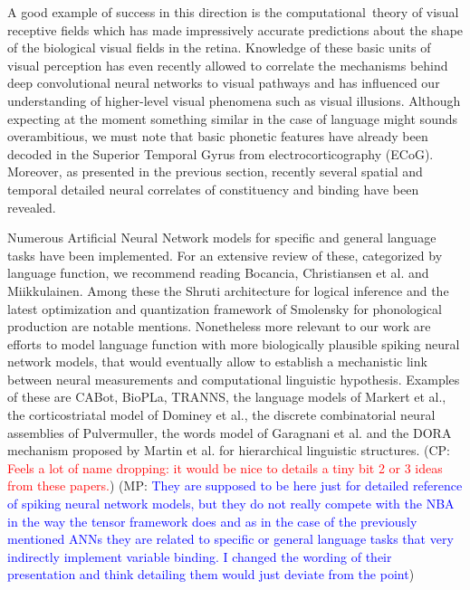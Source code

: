 \documentclass[10pt]{article}
\newcommand{\noteCP}[1]{(CP: \textcolor{red}{#1})}
\newcommand{\noteMP}[2]{(MP: \textcolor{blue}{#1})}
\begin{document}
A good example of success in this direction is the computational~theory of visual receptive fields\cite{lindeberg2017normative} which has made impressively accurate predictions about the shape of the biological visual fields in the retina.
Knowledge of these basic units of visual perception has even recently allowed to correlate the mechanisms behind deep convolutional neural networks to visual pathways\cite{Guclu_2015,Eickenberg_2017} and has influenced our understanding of higher-level visual phenomena such as visual illusions\cite{Eagleman_2001}.
Although expecting at the moment something similar in the case of language might sounds overambitious, we must note that basic phonetic features have already been decoded in the Superior Temporal Gyrus from electrocorticography (ECoG)\cite{Mesgarani_2014}.
Moreover, as presented in the previous section, recently several spatial and temporal detailed neural correlates of constituency and binding have been revealed.

Numerous Artificial Neural Network models for specific and general language tasks have been implemented.
For an extensive review of these, categorized by language function, we recommend reading Bocancia\cite{bocancia2014psycholinguistically}, Christiansen et al.\cite{Christiansen_1999} and Miikkulainen\cite{miikkulainen1997natural}.
Among these the Shruti architecture for logical inference\cite{Wendelken_2004} and the latest optimization and quantization framework of Smolensky for phonological production\cite{Smolensky_2013} are notable mentions.
Nonetheless more relevant to our work are efforts to model language function with more biologically plausible spiking neural network models, that would eventually allow to establish a mechanistic link between neural measurements and computational linguistic hypothesis.
Examples of these are CABot\cite{Huyck_2009}, BioPLa\cite{rosa2004thematic}, TRANNS\cite{bocancia2014psycholinguistically}, the language models of Markert et al.\cite{Markert_2007}, the corticostriatal model of Dominey et al.\cite{Dominey_2009}, the discrete combinatorial neural assemblies of Pulvermuller\cite{Pulverm_ller_2009, Pulverm_ller_2010}, the words model of Garagnani et al.\cite{Garagnani_2017} and the DORA mechanism proposed by Martin et al. for hierarchical linguistic structures\cite{Martin_2017}.
\noteCP{Feels a lot of name dropping: it would be nice to details a tiny bit 2 or 3 ideas from these papers.}
\noteMP{They are supposed to be here just for detailed reference of spiking neural network models, but they do not really compete with the NBA in the way the tensor framework does and as in the case of the previously mentioned ANNs they are related to specific or general language tasks that very indirectly implement variable binding. I changed the wording of their presentation and think detailing them would just deviate from the point}.
\end{document}
